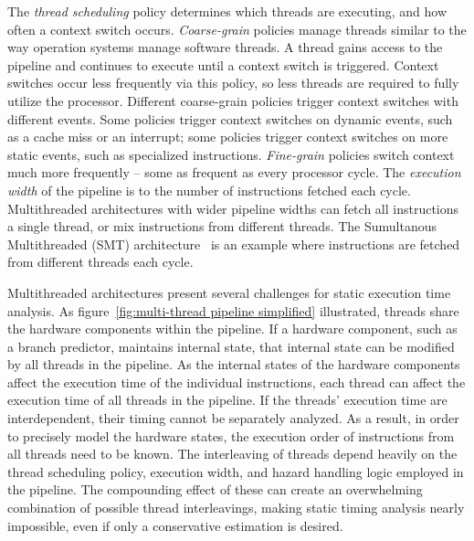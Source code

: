 The \emph{thread scheduling} policy determines which threads are executing, and how often a context switch occurs.  
\emph{Coarse-grain} policies manage threads similar to the way operation systems manage software threads.
A thread gains access to the pipeline and continues to execute until a context switch is triggered.
Context switches occur less frequently via this policy, so less threads are required to fully utilize the processor.
Different coarse-grain policies trigger context switches with different events. 
Some policies trigger context switches on dynamic events, such as a cache miss or an interrupt; some policies trigger context switches on more static events, such as specialized instructions.
\emph{Fine-grain} policies switch context much more frequently -- some as frequent as every processor cycle.
The \emph{execution width} of the pipeline is to the number of instructions fetched each cycle.  
Multithreaded architectures with wider pipeline widths can fetch all instructions a single thread, or mix instructions from different threads.
The Sumultanous Multithreaded (SMT) architecture~ is an example where instructions are fetched from different threads each cycle.

Multithreaded architectures present several challenges for static execution time analysis.
As figure~\ref{fig:multi-thread pipeline simplified} illustrated, threads share the hardware components within the pipeline.
If a hardware component, such as a branch predictor, maintains internal state, that internal state can be modified by all threads in the pipeline.
As the internal states of the hardware components affect the execution time of the individual instructions, each thread can affect the execution time of all threads in the pipeline. 
If the threads' execution time are interdependent, their timing cannot be separately analyzed.
As a result, in order to precisely model the hardware states, the execution order of instructions from all threads need to be known.
The interleaving of threads depend heavily on the thread scheduling policy, execution width, and hazard handling logic employed in the pipeline.
The compounding effect of these can create an overwhelming combination of possible thread interleavings, making static timing analysis nearly impossible, even if only a conservative estimation is desired.   

